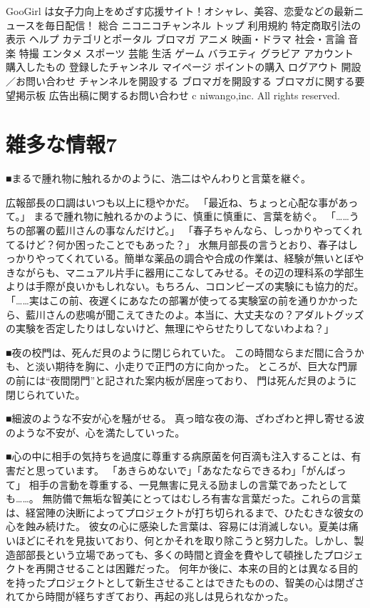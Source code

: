 GooGirl は女子力向上をめざす応援サイト！オシャレ、美容、恋愛などの最新ニュースを毎日配信！
総合
ニコニコチャンネル トップ 
利用規約 
特定商取引法の表示 
ヘルプ 
カテゴリとポータル
ブロマガ 
アニメ 
映画・ドラマ 
社会・言論 
音楽 
特撮 
エンタメ 
スポーツ 
芸能 
生活 
ゲーム 
バラエティ 
グラビア 
アカウント
購入したもの 
登録したチャンネル 
マイページ 
ポイントの購入 
ログアウト 
開設／お問い合わせ
チャンネルを開設する 
ブロマガを開設する 
ブロマガに関する要望掲示板 
広告出稿に関するお問い合わせ 
c niwango,inc. All rights reserved.

\section{雑多な情報7}
■まるで腫れ物に触れるかのように、浩二はやんわりと言葉を継ぐ。

広報部長の口調はいつも以上に穏やかだ。
「最近ね、ちょっと心配な事があって。」
まるで腫れ物に触れるかのように、慎重に慎重に、言葉を紡ぐ。
「……うちの部署の藍川さんの事なんだけど。」
「春子ちゃんなら、しっかりやってくれてるけど？何か困ったことでもあった？」
水無月部長の言うとおり、春子はしっかりやってくれている。簡単な薬品の調合や合成の作業は、経験が無いとぼやきながらも、マニュアル片手に器用にこなしてみせる。その辺の理科系の学部生よりは手際が良いかもしれない。もちろん、コロンビーズの実験にも協力的だ。
「……実はこの前、夜遅くにあなたの部署が使ってる実験室の前を通りかかったら、藍川さんの悲鳴が聞こえてきたのよ。本当に、大丈夫なの？アダルトグッズの実験を否定したりはしないけど、無理にやらせたりしてないわよね？」



■夜の校門は、死んだ貝のように閉じられていた。
この時間ならまだ間に合うかも、と淡い期待を胸に、小走りで正門の方に向かった。
ところが、巨大な門扉の前には“夜間閉門”と記された案内板が居座っており、
門は死んだ貝のように閉じられていた。

■細波のような不安が心を騒がせる。
真っ暗な夜の海、ざわざわと押し寄せる波のような不安が、心を満たしていった。


■心の中に相手の気持ちを過度に尊重する病原菌を何百滴も注入することは、有害だと思っています。
「あきらめないで」「あなたならできるわ」「がんばって」
相手の言動を尊重する、一見無害に見える励ましの言葉であったとしても……。
無防備で無垢な智美にとってはむしろ有害な言葉だった。これらの言葉は、経営陣の決断によってプロジェクトが打ち切られるまで、ひたむきな彼女の心を蝕み続けた。
彼女の心に感染した言葉は、容易には消滅しない。夏美は痛いほどにそれを見抜いており、何とかそれを取り除こうと努力した。しかし、製造部部長という立場であっても、多くの時間と資金を費やして頓挫したプロジェクトを再開させることは困難だった。
何年か後に、本来の目的とは異なる目的を持ったプロジェクトとして新生させることはできたものの、智美の心は閉ざされてから時間が経ちすぎており、再起の兆しは見られなかった。

